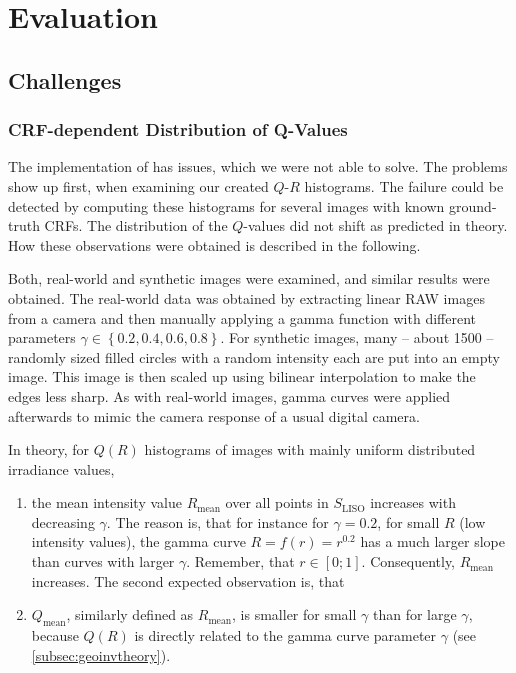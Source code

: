 \chapter{Evaluation}
\label{chap:evaluation}


\section{Challenges}
\label{sec:challenges}

\subsection{CRF-dependent Distribution of Q-Values}
\label{subsec:crfdependentdistributionofQvalues}

The implementation of \cite{ng_cvpr07} has issues, which we were not able to solve. The problems show up first, when examining our created $Q$-$R$ histograms. The failure could be detected by computing these histograms for several images with known ground-truth CRFs. The distribution of the $Q$-values did not shift as predicted in theory. How these observations were obtained is described in the following.

Both, real-world and synthetic images were examined, and similar results were obtained. The real-world data was obtained by extracting linear RAW images from a camera and then manually applying a gamma function with different parameters $\gamma \in \left\{ 0.2, 0.4, 0.6, 0.8 \right\}$. For synthetic images, many -- about 1500 -- randomly sized filled circles with a random intensity each are put into an empty image. This image is then scaled up using bilinear interpolation to make the edges less sharp. As with real-world images, gamma curves were applied afterwards to mimic the camera response of a usual digital camera.

In theory, for $Q(R)$ histograms of images with mainly uniform distributed irradiance values,
\begin{enumerate}
	\item the mean intensity value $R_\text{mean}$ over all points in $S_\text{LISO}$ increases with decreasing $\gamma$. The reason is, that for instance for $\gamma = 0.2$, for small $R$ (low intensity values), the gamma curve $R = f(r) = r^{0.2}$ has a much larger slope than curves with larger $\gamma$. Remember, that $r \in [0; 1]$. Consequently, $R_\text{mean}$ increases. The second expected observation is, that
	\item $Q_\text{mean}$, similarly defined as $R_\text{mean}$, is smaller for small $\gamma$ than for large $\gamma$, because $Q(R)$ is directly related to the gamma curve parameter $\gamma$ (see \autoref{subsec:geoinvtheory}).
\end{enumerate}

